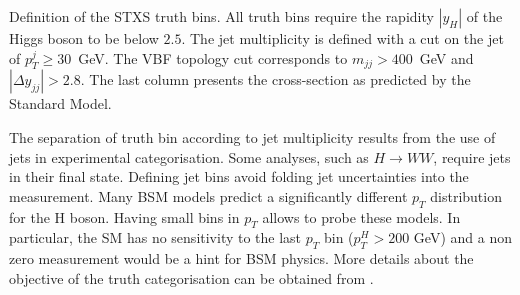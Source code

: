 \begin{enumerate}
\begin{sidewaystable}
\caption{Definition of the STXS truth bins. All truth bins require the rapidity $|y_H|$ of the Higgs boson to be below $2.5$. The jet multiplicity is defined with a cut on the jet of $p_T^j\ge 30$~GeV. The VBF topology cut corresponds to $m_{jj}>400$~GeV and $|\Delta y_{jj}|>2.8$. The last column presents the cross-section as predicted by the Standard Model. \cite{ATL-COM-PHYS-2016-1784}}
\label{tab:HGam_stxs_definition}
\end{sidewaystable}


The separation of truth bin according to jet multiplicity results from the use of jets in experimental categorisation.
Some analyses, such as \(H\rightarrow WW\), require jets in their final state.
Defining jet bins avoid folding jet uncertainties into the measurement.
Many BSM models predict a significantly different $p_T$ distribution for the H boson.
Having small bins in $p_T$ allows to probe these models.
In particular, the SM has no sensitivity to the last $p_T$ bin ($p_T^H>200$ GeV) and a non zero measurement would be a hint for BSM physics.
More details about the objective of the truth categorisation can be obtained from \cite{arXiv_1605.04692,ATL-COM-PHYS-2016-1784}.



\end{enumerate}
